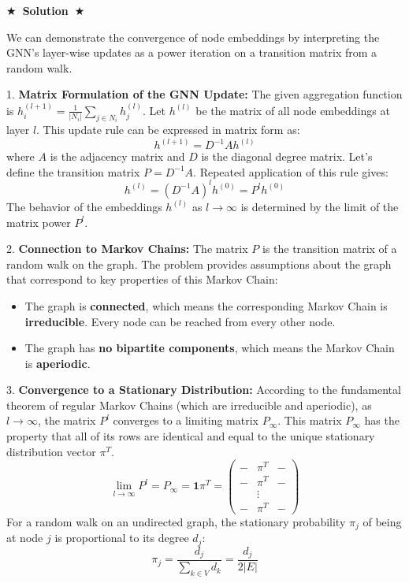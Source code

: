 \documentclass{article}
\numberwithin{figure}{section}
\newcommand{\Solution}[1]{%
	{%
		\medskip
		\color{red}
		\bf $\bigstar$~\sf\textbf{Solution}~$\bigstar$ \sf
		#1
	}
	\bigskip
}
\begin{document}
	\Solution{
		We can demonstrate the convergence of node embeddings by interpreting the GNN's layer-wise updates as a power iteration on a transition matrix from a random walk.
		
		1.  \textbf{Matrix Formulation of the GNN Update:}
		The given aggregation function is $h^{(l+1)}_i = \frac{1}{|N_i|} \sum_{j \in N_i} h^{(l)}_j$. Let $h^{(l)}$ be the matrix of all node embeddings at layer $l$. This update rule can be expressed in matrix form as:
		\[ h^{(l+1)} = D^{-1}A h^{(l)} \]
		where $A$ is the adjacency matrix and $D$ is the diagonal degree matrix. Let's define the transition matrix $P = D^{-1}A$. Repeated application of this rule gives:
		\[ h^{(l)} = (D^{-1}A)^l h^{(0)} = P^l h^{(0)} \]
		The behavior of the embeddings $h^{(l)}$ as $l \rightarrow \infty$ is determined by the limit of the matrix power $P^l$.
		
		2.  \textbf{Connection to Markov Chains:}
		The matrix $P$ is the transition matrix of a random walk on the graph. The problem provides assumptions about the graph that correspond to key properties of this Markov Chain:
		\begin{itemize}
			\item The graph is \textbf{connected}, which means the corresponding Markov Chain is \textbf{irreducible}. Every node can be reached from every other node.
			\item The graph has \textbf{no bipartite components}, which means the Markov Chain is \textbf{aperiodic}.
		\end{itemize}
		
		3.  \textbf{Convergence to a Stationary Distribution:}
		According to the fundamental theorem of regular Markov Chains (which are irreducible and aperiodic), as $l \rightarrow \infty$, the matrix $P^l$ converges to a limiting matrix $P_\infty$. This matrix $P_\infty$ has the property that all of its rows are identical and equal to the unique stationary distribution vector $\pi^T$.
		\[ \lim_{l\to\infty} P^l = P_\infty = \mathbf{1} \pi^T = 
		\begin{pmatrix}
			- & \pi^T & - \\
			- & \pi^T & - \\
			& \vdots & \\
			- & \pi^T & -
		\end{pmatrix}
		\]
		For a random walk on an undirected graph, the stationary probability $\pi_j$ of being at node $j$ is proportional to its degree $d_j$:
		\[ \pi_j = \frac{d_j}{\sum_{k \in V} d_k} = \frac{d_j}{2|E|} \]
		
}
\end{document}
